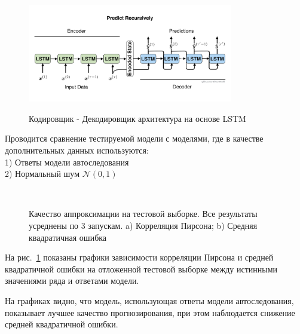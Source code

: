 \begin{figure}[H]\center
{\includegraphics[width=0.8\textwidth]{results/recursive.png}}
\caption{Кодировщик - Декодировщик архитектура на основе LSTM}
\end{figure}


\newpage

Проводится сравнение тестируемой модели с моделями, где в качестве дополнительных данных используются: \\
1) Ответы модели автоследования \\ 
2) Нормальный шум $ \mathcal{N}(0, 1) $

\begin{figure}[H]\center
{}
\\
\caption{Качество аппроксимации на тестовой выборке. Все результаты усреднены по 3 запускам. a) Корреляция Пирсона; b) Средняя квадратичная ошибка}
\label{lstm_plots}
\end{figure}

На рис.~\ref{lstm_plots} показаны графики зависимости корреляции Пирсона и средней квадратичной ошибки на отложенной тестовой выборке между истинными значениями ряда и ответами модели.

На графиках видно, что модель, использующая ответы модели автоследования, показывает лучшее качество прогнозирования, при этом наблюдается снижение средней квадратичной ошибки. 

